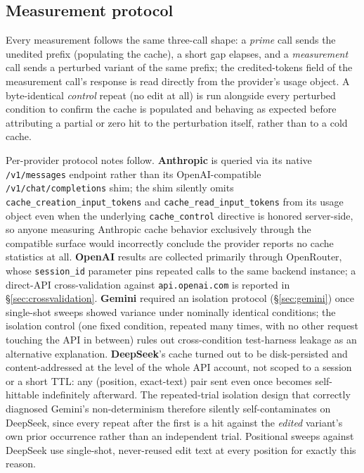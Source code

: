 \documentclass[11pt]{article}
\newcommand{\code}[1]{\texttt{#1}}
\begin{document}
\subsection{Measurement protocol}
Every measurement follows the same three-call shape: a \emph{prime} call
sends the unedited prefix (populating the cache), a short gap elapses, and a
\emph{measurement} call sends a perturbed variant of the same prefix; the
credited-tokens field of the measurement call's response is read directly
from the provider's usage object. A byte-identical \emph{control} repeat
(no edit at all) is run alongside every perturbed condition to confirm the
cache is populated and behaving as expected before attributing a partial or
zero hit to the perturbation itself, rather than to a cold cache.

Per-provider protocol notes follow. \textbf{Anthropic} is queried via its
native \code{/v1/messages} endpoint rather than its OpenAI-compatible
\code{/v1/chat/completions} shim; the shim silently omits
\code{cache\_creation\_input\_tokens} and \code{cache\_read\_input\_tokens}
from its usage object even when the underlying \code{cache\_control}
directive is honored server-side, so anyone measuring Anthropic cache
behavior exclusively through the compatible surface would incorrectly
conclude the provider reports no cache statistics at all.
\textbf{OpenAI} results are collected primarily through OpenRouter, whose
\code{session\_id} parameter pins repeated calls to the same backend
instance; a direct-API cross-validation against \code{api.openai.com} is
reported in \S\ref{sec:crossvalidation}. \textbf{Gemini} required an
isolation protocol (\S\ref{sec:gemini}) once single-shot sweeps showed
variance under nominally identical conditions; the isolation control (one
fixed condition, repeated many times, with no other request touching the
API in between) rules out cross-condition test-harness leakage as an
alternative explanation. \textbf{DeepSeek}'s cache turned out to be
disk-persisted and content-addressed at the level of the whole API account,
not scoped to a session or a short TTL: any (position, exact-text) pair
sent even once becomes self-hittable indefinitely afterward. The
repeated-trial isolation design that correctly diagnosed Gemini's
non-determinism therefore silently self-contaminates on DeepSeek, since
every repeat after the first is a hit against the \emph{edited} variant's
own prior occurrence rather than an independent trial. Positional sweeps
against DeepSeek use single-shot, never-reused edit text at every position
for exactly this reason.
\end{document}
